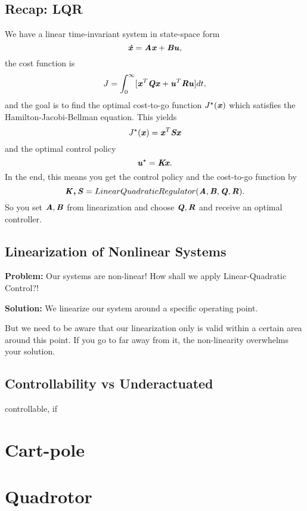 \subsection{Recap: LQR}
We have a linear time-invariant system in state-space form
\begin{equation*} 
\bm{\mathit{\dot{x}}}=\bm{\mathit{Ax}}+\bm{\mathit{Bu}},
\end{equation*}
the cost function is 
\begin{equation*} 
J = \int_0^{\infty}[\bm{\mathit{x}}^T\bm{\mathit{Qx}}+\bm{\mathit{u}}	^T\bm{\mathit{Ru}}]dt,
\end{equation*}
and the goal is to find the optimal cost-to-go function $J^\star(\bm{\mathit{x}})$ which satisfies the Hamilton-Jacobi-Bellman equation.
This yields 
\begin{equation*} 
J^\star(\bm{\mathit{x}}) = \bm{\mathit{x}}^T\bm{\mathit{Sx}}
\end{equation*}
and the optimal control policy 
\begin{equation*} 
\bm{\mathit{u}}^\star=\bm{\mathit{Kx}}.
\end{equation*}
In the end, this means you get the control policy and the cost-to-go function by
\begin{equation*} 
\bm{\mathit{K,S}}=LinearQuadraticRegulator(\bm{\mathit{A}}, \bm{\mathit{B}}, \bm{\mathit{Q}}, \bm{\mathit{R}}).
\end{equation*}
So you set $\bm{\mathit{A}}, \bm{\mathit{B}}$ from linearization and choose $\bm{\mathit{Q}}, \bm{\mathit{R}}$ and receive an optimal controller.

\subsection{Linearization of Nonlinear Systems}
\textbf{Problem:} Our systems are non-linear! How shall we apply Linear-Quadratic Control?!

\textbf{Solution:} We linearize our system around a specific operating point.

But we need to be aware that our linearization only is valid within a certain area around this point. If you go to far away from it, the non-linearity overwhelms your solution. 

\subsection{Controllability vs Underactuated}
\begin{definition}
	controllable, if 
\end{definition}










	
	

\section{Cart-pole}
\section{Quadrotor}

